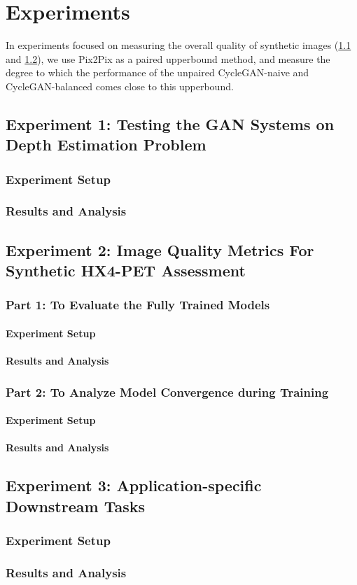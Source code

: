 \chapter{Experiments}
\label{Experiments}
In experiments focused on measuring the overall quality of synthetic images (\ref{Expt_1} and \ref{Expt_2}), we use Pix2Pix as a paired upperbound method, and measure the degree to which the performance of the unpaired CycleGAN-naive and CycleGAN-balanced comes close to this upperbound.

\section{Experiment 1: Testing the GAN Systems on Depth Estimation Problem}
\label{Expt_1}
\subsection{Experiment Setup}
\subsection{Results and Analysis}


 
\section{Experiment 2: Image Quality Metrics For Synthetic HX4-PET Assessment}
\label{Expt_2}
\subsection{Part 1: To Evaluate the Fully Trained Models}
\subsubsection{Experiment Setup}
\subsubsection{Results and Analysis}

\subsection{Part 2: To Analyze Model Convergence during Training}
\subsubsection{Experiment Setup}
\subsubsection{Results and Analysis}



\section{Experiment 3: Application-specific Downstream Tasks}
\label{Expt_3}
\subsection{Experiment Setup}
\subsection{Results and Analysis}
